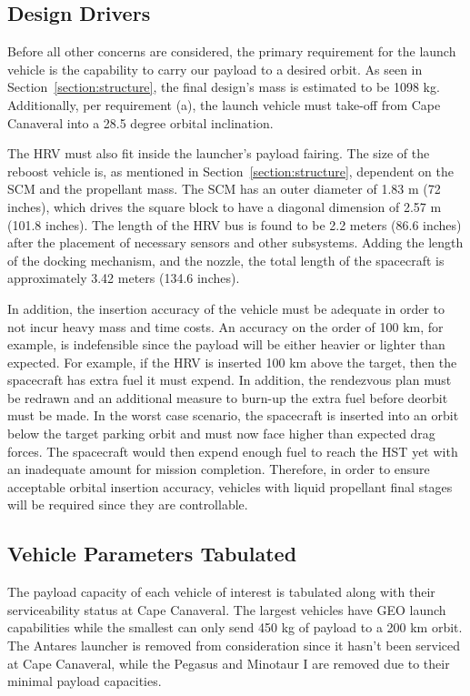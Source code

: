 \documentclass[paper=letter, fontsize=11pt]{scrartcl} %
\numberwithin{equation}{section} %
\numberwithin{figure}{section} %
\numberwithin{table}{section} %
\begin{document}
\subsection{Design Drivers}

Before all other concerns are considered, the primary requirement for the launch vehicle is the capability to carry our payload to a desired orbit. As seen in Section~\ref{section:structure}, the final design's mass is estimated to be 1098 kg. Additionally, per requirement (a), the launch vehicle must take-off from Cape Canaveral into a 28.5 degree orbital inclination.

The HRV must also fit inside the launcher's payload fairing. The size of the reboost vehicle is, as mentioned in Section~\ref{section:structure}, dependent on the SCM and the propellant mass. The SCM has an outer diameter of 1.83 m (72 inches), which drives the square block to have a diagonal dimension of 2.57 m (101.8 inches). The length of the HRV bus is found to be 2.2 meters (86.6 inches) after the placement of necessary sensors and other subsystems. Adding the length of the docking mechanism, and the nozzle, the total length of the spacecraft is approximately 3.42 meters (134.6 inches).

In addition, the insertion accuracy of the vehicle must be adequate in order to not incur heavy mass and time costs. An accuracy on the order of 100 km, for example, is indefensible since the payload will be either heavier or lighter than expected. For example, if the HRV is inserted 100 km above the target, then the spacecraft has extra fuel it must expend. In addition, the rendezvous plan must be redrawn and an additional measure to burn-up the extra fuel before deorbit must be made. In the worst case scenario, the spacecraft is inserted into an orbit below the target parking orbit and must now face higher than expected drag forces. The spacecraft would then expend enough fuel to reach the HST yet with an inadequate amount for mission completion. Therefore, in order to ensure acceptable orbital insertion accuracy, vehicles with liquid propellant final stages will be required since they are controllable.


\subsection{Vehicle Parameters Tabulated}
The payload capacity of each vehicle of interest is tabulated along with their serviceability status at Cape Canaveral. The largest vehicles have GEO launch capabilities while the smallest can only send 450 kg of payload to a 200 km orbit. The Antares launcher is removed from consideration since it hasn't been serviced at Cape Canaveral, while the Pegasus and Minotaur I are removed due to their minimal payload capacities.
\end{document}

